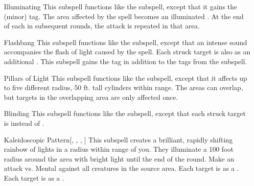 \begin{ability}[\nth{2}]{Illuminating}
This subspell functions like the  subspell, except that it gains the  (minor) tag.
The area affected by the spell becomes an illuminated .
At the end of each  in subsequent rounds, the attack is repeated in that area.
\end{ability}
\vspace{0.25em}



\begin{ability}[\nth{3}]{Flashbang}
This subspell functions like the  subspell, except that an intense sound accompanies the flash of light caused by the spell.
Each struck target is also  as an additional .
This subspell gains the  tag in addition to the tags from the  subspell.
\end{ability}
\vspace{0.25em}



\begin{ability}[\nth{3}]{Pillars of Light}
This subspell functions like the  subspell, except that it affects up to five different \areasmall radius, 50 ft. tall cylinders within range.
The areas can overlap, but targets in the overlapping area are only affected once.
\end{ability}
\vspace{0.25em}



\begin{ability}[\nth{4}]{Blinding}
This subspell functions like the  subspell, except that each struck target is  instead of .
\end{ability}
\vspace{0.25em}



\begin{ability}[\nth{4}]{Kaleidoscopic Pattern}[, , , ]
This subspell creates a brilliant, rapidly shifting rainbow of lights in a \areasmall radius within \rngmed range of you.
They illuminate a 100 foot radius around the area with bright light until the end of the round.
Make an attack vs. Mental against all creatures in the source area.
\hit Each target is \disoriented as a .
\crit Each target is \confused as a .
\end{ability}
\vspace{0.25em}



